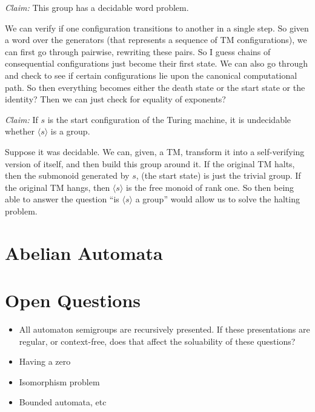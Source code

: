 \documentclass[11pt]{article}
\begin{document}
\textit{Claim:} This group has a decidable word problem.

We can verify if one configuration transitions to another in a single
step. So given a word over the generators (that represents a sequence
of TM configurations), we can first go through pairwise, rewriting
these pairs. So I guess chains of consequential configurations just
become their first state. We can also go through and check to see if
certain configurations lie upon the canonical computational path. So
then everything becomes either the death state or the start state or
the identity? Then we can just check for equality of exponents?

\textit{Claim:} If $s$ is the start configuration of the Turing
machine, it is undecidable whether $\langle s \rangle$ is a group.

Suppose it was decidable. We can, given, a TM, transform it into a
self-verifying version of itself, and then build this group around
it. If the original TM halts, then the submonoid generated by $s$,
(the start state) is just the trivial group. If the original TM hangs,
then $\langle s \rangle$ is the free monoid of rank one. So then being
able to answer the question ``is $\langle s \rangle $ a group'' would
allow us to solve the halting problem.

\section{Abelian Automata}

\section{Open Questions}

\begin{itemize}
\item All automaton semigroups are recursively presented. If these
  presentations are regular, or context-free, does that affect the
  soluability of these questions?
\item Having a zero
\item Isomorphism problem
\item Bounded automata, etc
\end{itemize}

\nocite{*}

\end{document}
